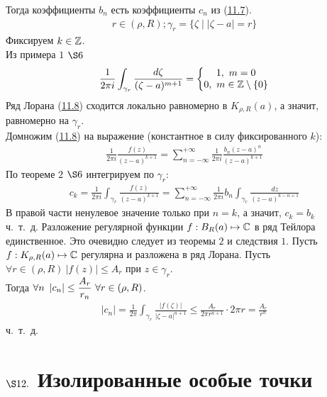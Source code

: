 Тогда коэффициенты $b_n$ есть коэффициенты $c_n$ из (\href{(11.7)}{11.7}).
\pr
\begin{align*}
  r \in (\rho, R); \gamma_r = \{\zeta \mid \left| \zeta - a \right| = r\}
\end{align*}
Фиксируем $k \in \mathbb{Z}$.
\\
Из примера $1$ $\S6$
\begin{align*}
  \frac{1}{2 \pi i} \int_{\gamma_r}\frac{d\zeta}{(\zeta - a)^{m+1}} = \left\{ \begin{matrix}
          1, \ m = 0 \\
          0, \ m \in \mathbb{Z} \setminus\{0\}
      \end{matrix} \right.
\end{align*}
Ряд Лорана (\href{(11.8)}{11.8}) сходится локально равномерно в $K_{\rho,R}(a)$,
а значит, равномерно на $\gamma_r$.
\\
Домножим (\href{(11.8)}{11.8}) на выражение (константное в силу фиксированного
$k$):
\begin{align*}
  \frac{1}{2\pi i}\frac{f(z)}{(z-a)^{k+1}} = \sum_{n = -\infty}^{+\infty} \frac{1}{2 \pi i}\frac{b_n(z-a)^n}{(z-a)^{k+1}}
\end{align*}
По теореме $2$ $\S 6$ интегрируем по $\gamma_r$:
\begin{align*}
  c_k = \frac{1}{2 \pi i} \int_{\gamma_r}\frac{f(z)}{(z - a)^{k+1}} = \sum_{n = -\infty}^{+\infty} \frac{1}{2\pi i}b_n \int_{\gamma_r}\frac{dz}{(z-a)^{k-n+1}}
\end{align*}
В правой части ненулевое значение только при $n=k$, а значит, $c_k = b_k$
\\
ч.~т.~д.
\corollary
Разложение регулярной функции $f: B_R(a) \mapsto \mathbb{C}$ в ряд Тейлора
единственное.
\pr
Это очевидно следует из теоремы $2$ и следствия $1$.
\corollary
Пусть $f:K_{\rho,R}(a) \mapsto \mathbb{C}$ регулярна и разложена в ряд Лорана. Пусть
$\forall r \in (\rho, R) \ \left| f(z) \right|\leq A_r$ при $z \in \gamma_r$.
\\
Тогда $\forall n \ \left| c_n \right| \leq \displaystyle \frac{A_r}{r_n} \ \forall r \in
(\rho, R)$.
\pr
\begin{align*}
  \left| c_n \right| = \frac{1}{2 \pi} \int_{\gamma_r}\frac{\left| f(\zeta) \right|}{\left| \zeta - a \right|^{n+1}} \leq \frac{A_r}{2 \pi r^{n+1}} \cdot 2 \pi r = \frac{A_r}{r^n}
\end{align*}
ч.~т.~д.
\section{$\S 12.$ Изолированные особые точки}
